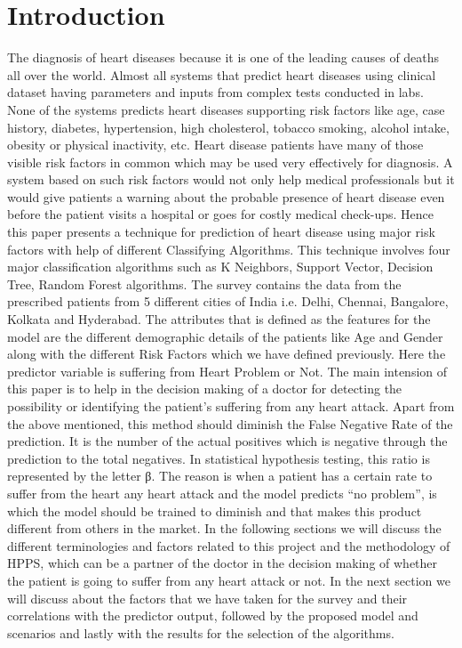 \documentclass{article}
\begin{document}
\section{Introduction}
The diagnosis of heart diseases because it is one of the leading causes of deaths all over the world. Almost all systems that predict heart diseases using clinical dataset having parameters and inputs from complex tests conducted in labs. None of the systems predicts heart diseases supporting risk factors like age, case history, diabetes, hypertension, high cholesterol, tobacco smoking, alcohol intake, obesity or physical inactivity, etc.
Heart disease patients have many of those visible risk factors in common which may be used very effectively for diagnosis. A system based on such risk factors would not only help medical professionals but it would give patients a warning about the probable presence of heart disease even before the patient visits a hospital or goes for costly medical check-ups. Hence this paper presents a technique for prediction of heart disease using major risk factors with help of different Classifying Algorithms. This technique involves four major classification algorithms such as K Neighbors, Support Vector, Decision Tree, Random Forest algorithms.
The survey contains the data from the prescribed patients from 5 different cities of India i.e. Delhi, Chennai, Bangalore, Kolkata and Hyderabad. The attributes that is defined as the features for the model are the different demographic details of the patients like Age and Gender along with the different Risk Factors which we have defined previously. Here the predictor variable is suffering from Heart Problem or Not.
The main intension of this paper is to help in the decision making of a doctor for detecting the possibility or identifying the patient’s suffering from any heart attack. Apart from the above mentioned, this method should diminish the False Negative Rate of the prediction. It is the number of the actual positives which is negative through the prediction to the total negatives. In statistical hypothesis testing, this ratio is represented by the letter β. The reason is when a patient has a certain rate to suffer from the heart any heart attack and the model predicts “no problem”, is which the model should be trained to diminish and that makes this product different from others in the market. In the following sections we will discuss the different terminologies and factors related to this project and the methodology of HPPS, which can be a partner of the doctor in the decision making of whether the patient is going to suffer from any heart attack or not. In the next section we will discuss about the factors that we have taken for the survey and their correlations with the predictor output, followed by the proposed model and scenarios and lastly with the results for the selection of the algorithms.
\end{document}
